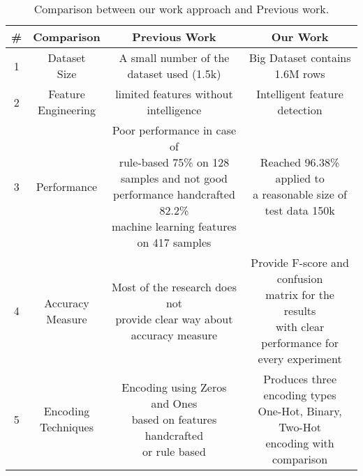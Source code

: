 \begin{table}[H]
  \centering
  \begin{tabular}{c c c c}
    \hline
    \textbf{\#} & \textbf{Comparison} & \textbf{Previous Work} & \textbf{Our Work} \\
    \hline
    1 & \makecell{Dataset\\Size} & A small number of the dataset used (1.5k) & Big Dataset contains 1.6M rows    \\
        \hline
    2 & \makecell{Feature\\Engineering} & limited features without intelligence  & Intelligent feature detection   \\
        \hline
    3 & Performance & \makecell{Poor performance in case of\\ rule-based 75\% on 128 samples and not good \\performance handcrafted 82.2\% \\machine learning features on 417 samples}  & \makecell{Reached 96.38\% applied to \\a reasonable size of test data 150k}  \\

    \hline
        4 & \makecell{Accuracy\\Measure} & \makecell{Most of the research does not \\provide clear way about \\accuracy measure }  & \makecell{Provide F-score and confusion\\ matrix for the results\\ with clear performance for\\ every experiment}  \\

    \hline
    5 & \makecell{Encoding\\Techniques} & \makecell{Encoding using Zeros and Ones \\ based on features handcrafted \\or rule based }    & \makecell{Produces three encoding types\\  One-Hot, Binary, Two-Hot \\encoding with comparison }  \\

    \hline
 \end{tabular}
  \caption{Comparison between our work approach and Previous work. }\label{arud:feet}
\end{table}



